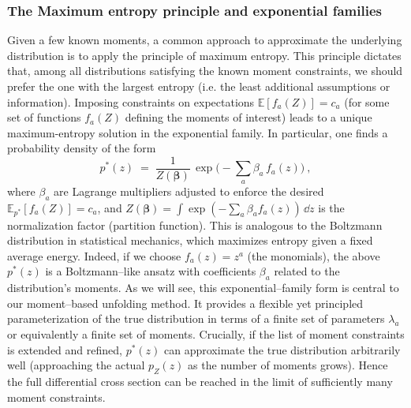         \subsubsection{The Maximum entropy principle and exponential families}
            Given a few known moments, a common approach to approximate the underlying distribution is to apply the principle of maximum entropy.
            This principle dictates that, among all distributions satisfying the known moment constraints, we should prefer the one with the largest entropy (i.e. the least additional assumptions or information).
            Imposing constraints on expectations $\mathbb{E}[f_a(Z)] = c_a$ (for some set of functions $f_a(Z)$ defining the moments of interest) leads to a unique maximum-entropy solution in the exponential family.
            In particular, one finds a probability density of the form
            \[
                p^*(z) \;=\; \frac{1}{Z(\boldsymbol{\beta})}\,\exp\!\Big(-\sum_{a}\beta_a\,f_a(z)\Big)~,
            \]
            where $\beta_a$ are Lagrange multipliers adjusted to enforce the desired $\mathbb{E}_{p^*}[f_a(Z)] = c_a$, and $Z(\boldsymbol{\beta}) = \int \exp(-\sum_a \beta_a f_a(z))\,\dd z$ is the normalization factor (partition function).
            This is analogous to the Boltzmann distribution in statistical mechanics, which maximizes entropy given a fixed average energy.
            Indeed, if we choose $f_a(z) = z^a$ (the monomials), the above $p^*(z)$ is a Boltzmann--like ansatz with coefficients $\beta_a$ related to the distribution’s moments.
            As we will see, this exponential--family form is central to our moment--based unfolding method.
            It provides a flexible yet principled parameterization of the true distribution in terms of a finite set of parameters ${\lambda_a}$ or equivalently a finite set of moments.
            Crucially, if the list of moment constraints is extended and refined, $p^*(z)$ can approximate the true distribution arbitrarily well (approaching the actual $p_Z(z)$ as the number of moments grows).
            Hence the full differential cross section can be reached in the limit of sufficiently many moment constraints.

